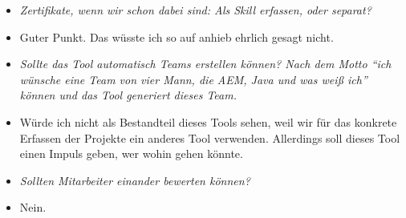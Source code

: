 \begin{itemize}
\item[] \textit{Zertifikate, wenn wir schon dabei sind: Als Skill erfassen, oder separat?}
\item[] Guter Punkt. Das wüsste ich so auf anhieb ehrlich gesagt nicht.

\item[] \textit{Sollte das Tool automatisch Teams erstellen können? Nach dem Motto “ich wünsche eine Team von vier Mann, die AEM, Java und was weiß ich” können und das Tool generiert dieses Team.}
\item[] Würde ich nicht als Bestandteil dieses Tools sehen, weil wir für das konkrete Erfassen der Projekte ein anderes Tool verwenden. Allerdings soll dieses Tool einen Impuls geben, wer wohin gehen könnte.
\item[] \textit{Sollten Mitarbeiter einander bewerten können?}
\item[] Nein.
\end{itemize}

\newpage

